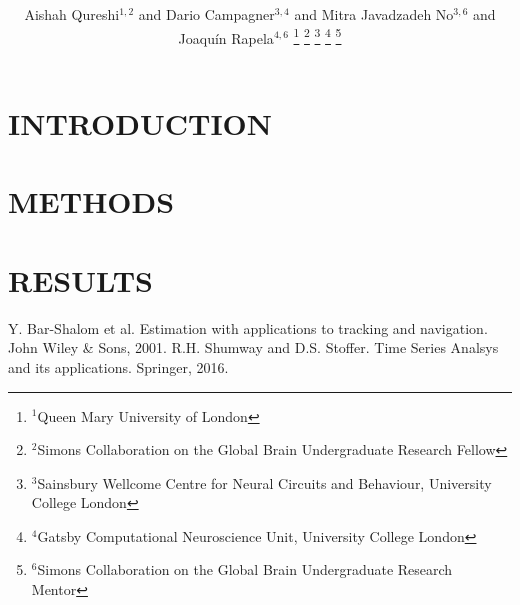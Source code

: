 \documentclass[letterpaper, 10 pt, conference]{ieeeconf}  %
\title{\LARGE \bf

}
\author{Aishah Qureshi$^{1,2}$ and Dario Campagner$^{3,4}$ and
Mitra Javadzadeh No$^{3,6}$ and
Joaqu\'{i}n Rapela$^{4,6}$%
\thanks{$^{1}$Queen Mary University of London}%
\thanks{$^{2}$Simons Collaboration on the Global Brain Undergraduate Research Fellow}%
\thanks{$^{3}$Sainsbury Wellcome Centre for Neural Circuits and Behaviour, University College London}%
\thanks{$^{4}$Gatsby Computational Neuroscience Unit, University College London}%
\thanks{$^{6}$Simons Collaboration on the Global Brain Undergraduate Research Mentor}%
}
\begin{document}
\maketitle
\thispagestyle{empty}
\pagestyle{empty}


\begin{abstract}



\end{abstract}



\section{INTRODUCTION}



\section{METHODS}



\section{RESULTS}



\addtolength{\textheight}{-12cm}   %








\begin{thebibliography}{99}

 Y. Bar-Shalom et al. Estimation with applications to tracking and navigation. John Wiley \& Sons, 2001.
 R.H. Shumway and D.S. Stoffer. Time Series Analsys and its applications. Springer, 2016.
\end{thebibliography}
\end{document}

